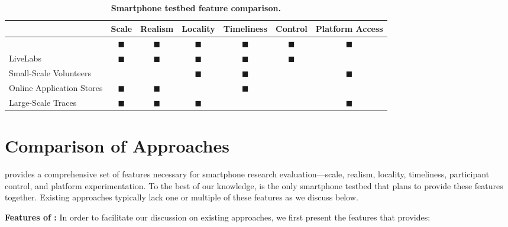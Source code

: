 \begin{table*}[t]
\begin{tabularx}{\textwidth}{Xcccccc}
&
{\normalsize{\textbf{Scale}}} &
{\normalsize{\textbf{Realism}}} &
{\normalsize{\textbf{Locality}}} &
{\normalsize{\textbf{Timeliness}}} &
{\normalsize{\textbf{Control}}} &
{\normalsize{\textbf{Platform Access}}} \\
\toprule
{\large \PhoneLab{}} & $\blacksquare$ & $\blacksquare$ & $\blacksquare$ & $\blacksquare$ & $\blacksquare$ & $\blacksquare$ \\
\toprule
LiveLabs & $\blacksquare$ & $\blacksquare$ & $\blacksquare$ & $\blacksquare$ & $\blacksquare$ & \\
\midrule
Small-Scale Volunteers & & & $\blacksquare$ & $\blacksquare$ & & $\blacksquare$ \\
\midrule
Online Application Stores & $\blacksquare$ & $\blacksquare$ & & $\blacksquare$ & & \\
\midrule
Large-Scale Traces & $\blacksquare$ & $\blacksquare$ & $\blacksquare$ & & & $\blacksquare$ \\
\end{tabularx}
\caption{\textbf{Smartphone testbed feature comparison.}}
\label{tab:comparison}
\end{table*}

\section{Comparison of Approaches}
\label{sec:comparison}

\PhoneLab{} provides a comprehensive set of features necessary for smartphone
research evaluation---scale, realism, locality, timeliness, participant control,
and platform experimentation. To the best of our knowledge, \PhoneLab{} is the
only smartphone testbed that plans to provide these features together. Existing
approaches typically lack one or multiple of these features as we discuss below.

{\bf Features of \PhoneLab{}:} In order to facilitate our discussion on existing
approaches, we first present the features that \PhoneLab{} provides:

